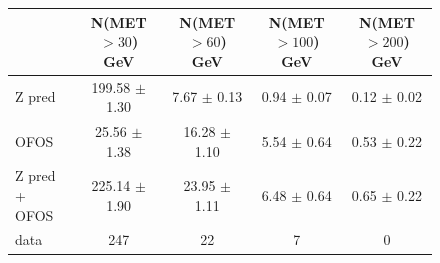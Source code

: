 \begin{figure}[hbtp]
  \begin{center}

	\medskip 

    \begin{tabular}{lcccc}
\hline

                        &   N(MET $>30$)  GeV    &   N(MET $>60$)  GeV    &   N(MET $>100$) GeV    &   N(MET $>200$) GeV \\
\hline
              Z pred    & 199.58  $\pm$  1.30    &   7.67  $\pm$  0.13    &    0.94 $\pm$  0.07    &   0.12  $\pm$  0.02 \\
                OFOS    &  25.56  $\pm$  1.38    &  16.28  $\pm$  1.10    &    5.54 $\pm$  0.64    &   0.53  $\pm$  0.22 \\
\hline
       Z pred + OFOS    & 225.14  $\pm$  1.90    &  23.95  $\pm$  1.11    &    6.48 $\pm$  0.64    &   0.65  $\pm$  0.22 \\
\hline
                   data &   247                  &    22                  &     7                  &     0 \\

\hline
    \end{tabular}

    \caption{  }
    \label{fig:pfmet_ee}
  \end{center}
\end{figure}

